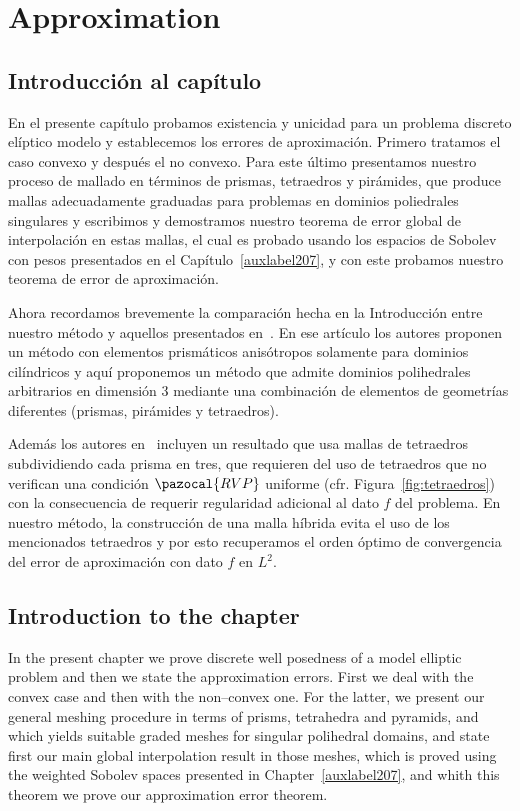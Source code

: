 \chapter{Approximation}\label{auxLabel100}
\section*{Introducci\'on al cap\'itulo}
En el presente cap\'itulo probamos existencia y unicidad
para un problema discreto el\'iptico modelo y establecemos
los errores de aproximaci\'on.
Primero tratamos el caso convexo y despu\'es el no convexo. 
Para este \'ultimo presentamos nuestro proceso de mallado
en t\'erminos de prismas, tetraedros y pir\'amides, que produce
mallas adecuadamente graduadas para problemas en dominios poliedrales singulares
y escribimos y demostramos nuestro teorema de error global de
interpolaci\'on en estas mallas, el cual es probado usando los espacios
de Sobolev con pesos presentados en el Cap\'itulo~\ref{auxlabel207},
y con este probamos nuestro teorema de error de aproximaci\'on.

Ahora recordamos brevemente la comparaci\'on hecha en
la Introducci\'on entre nuestro m\'etodo y 
aquellos presentados en~\cite{MR1866274}. En ese art\'iculo
los autores proponen un m\'etodo con elementos 
prism\'aticos anis\'otropos solamente para
dominios cil\'indricos y aqu\'i proponemos un m\'etodo
que admite dominios polihedrales arbitrarios en
dimensi\'on 3 mediante una combinaci\'on
de elementos de geometr\'ias diferentes (prismas,
pir\'amides y tetraedros).

Adem\'as los autores en~\cite{MR1866274} incluyen
un resultado que usa mallas de tetraedros subdividiendo
cada prisma en tres, que requieren del uso de
tetraedros que no verifican una condici\'on 
$\pazocal{RVP}$ uniforme (cfr. Figura~\ref{fig:tetraedros})
con la consecuencia de requerir regularidad
adicional al dato $f$ del problema. En nuestro m\'etodo,
la construcci\'on de una malla
h\'ibrida evita el uso de los mencionados tetraedros
y por esto recuperamos el orden \'optimo de convergencia
del error de aproximaci\'on con dato $f$ en $L^2$.

\section*{Introduction to the chapter}
In the present chapter we prove
discrete well posedness of a model elliptic problem
and then we state the approximation errors.
First we deal with the convex case and then with the  non--convex
one. For the latter, we present our general meshing procedure
in terms of prisms, tetrahedra and pyramids, and which yields
suitable graded meshes for singular polihedral domains, 
and state first our main
global interpolation result in those meshes, which is proved using the 
weighted Sobolev spaces presented in Chapter~\ref{auxlabel207},
and whith this theorem we prove our approximation error theorem.

